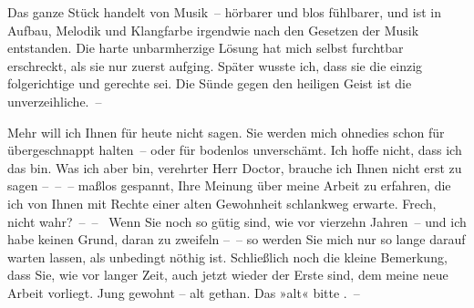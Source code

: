 \pstart
           Das ganze Stück handelt von Musik –
               hörbarer und blos fühlbarer, und ist in Aufbau, Melodik und Klangfarbe irgendwie nach
               den Gesetzen der Musik entstanden. Die harte unbarmherzige Lösung hat mich selbst
               furchtbar erschreckt, als sie nur zuerst aufging. Später wusste ich, dass sie die
               einzig folgerichtige und gerechte sei. Die Sünde gegen den heiligen Geist ist die
               unverzeihliche. –\pend
           
\pstart
           Mehr will ich Ihnen für heute nicht sagen. Sie werden mich ohnedies schon für
               übergeschnappt halten – oder für bodenlos unverschämt. Ich hoffe nicht, dass ich das
               bin. {\pb}Was ich aber bin, verehrter Herr Doctor, brauche ich Ihnen nicht
               erst zu sagen – – – maßlos gespannt, Ihre Meinung über meine Arbeit zu erfahren, die ich von Ihnen
               mit Rechte einer alten Gewohnheit schlankweg erwarte. Frech, nicht wahr? – – 
               Wenn Sie noch so gütig sind, wie vor vierzehn Jahren – und ich habe keinen Grund,
               daran zu zweifeln – – so werden Sie mich nur so lange darauf warten lassen, als
               unbedingt nöthig ist. Schließlich noch die kleine Bemerkung, dass Sie, wie vor langer
               Zeit, auch jetzt wieder der Erste sind, dem meine neue Arbeit vorliegt. Jung gewohnt – alt gethan. Das »alt« bitte
               \label{K_L03730-4v}\label{K_L03730-4}. –\pend
           
